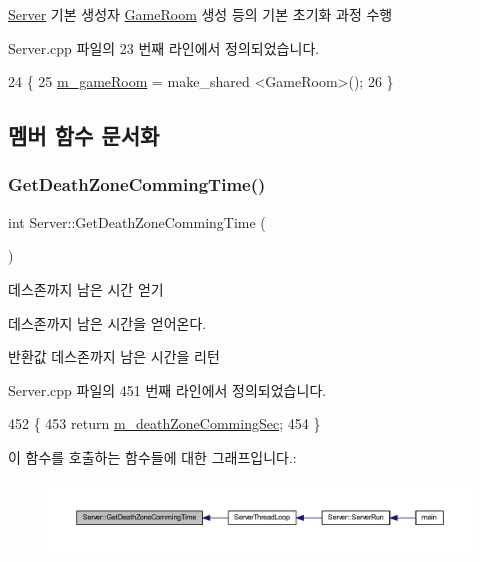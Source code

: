 \hyperlink{class_server}{Server} 기본 생성자  \hyperlink{class_game_room}{Game\+Room} 생성 등의 기본 초기화 과정 수행 



Server.\+cpp 파일의 23 번째 라인에서 정의되었습니다.


\begin{DoxyCode}
24 \{
25     \hyperlink{class_server_a77f414d5bb41dd5de8626d8cd621113c}{m\_gameRoom} = make\_shared <GameRoom>();
26 \}
\end{DoxyCode}


\subsection{멤버 함수 문서화}
\mbox{\label{class_server_abd194d047570b5959ae56948d4bbc9bd}} 
\subsubsection{\texorpdfstring{Get\+Death\+Zone\+Comming\+Time()}{GetDeathZoneCommingTime()}}
{\footnotesize\ttfamily int Server\+::\+Get\+Death\+Zone\+Comming\+Time (\begin{DoxyParamCaption}{ }\end{DoxyParamCaption})}



데스존까지 남은 시간 얻기 

데스존까지 남은 시간을 얻어온다.

\begin{DoxyReturn}{반환값}
데스존까지 남은 시간을 리턴 
\end{DoxyReturn}


Server.\+cpp 파일의 451 번째 라인에서 정의되었습니다.


\begin{DoxyCode}
452 \{
453     \textcolor{keywordflow}{return} \hyperlink{class_server_ac613fa786c19b3604dac2fd1619293c3}{m\_deathZoneCommingSec};
454 \}
\end{DoxyCode}
이 함수를 호출하는 함수들에 대한 그래프입니다.\+:\nopagebreak
\begin{figure}[H]
\begin{center}
\leavevmode
\includegraphics[width=350pt]{class_server_abd194d047570b5959ae56948d4bbc9bd_icgraph}
\end{center}
\end{figure}
\mbox{\label{class_server_a2e2dda4eb32e6f0a43ca8aba93d4d9a9}} 

